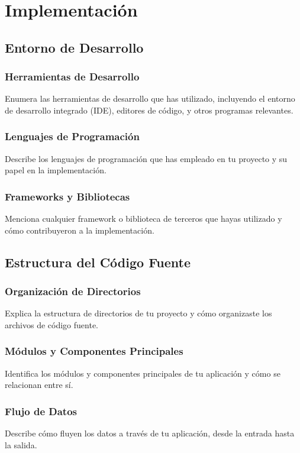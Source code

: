 \section{Implementación}

\subsection{Entorno de Desarrollo}

\subsubsection{Herramientas de Desarrollo}
Enumera las herramientas de desarrollo que has utilizado, incluyendo el entorno de desarrollo integrado (IDE), editores de código, y otros programas relevantes.

\subsubsection{Lenguajes de Programación}
Describe los lenguajes de programación que has empleado en tu proyecto y su papel en la implementación.

\subsubsection{Frameworks y Bibliotecas}
Menciona cualquier framework o biblioteca de terceros que hayas utilizado y cómo contribuyeron a la implementación.

\subsection{Estructura del Código Fuente}

\subsubsection{Organización de Directorios}
Explica la estructura de directorios de tu proyecto y cómo organizaste los archivos de código fuente.

\subsubsection{Módulos y Componentes Principales}
Identifica los módulos y componentes principales de tu aplicación y cómo se relacionan entre sí.

\subsubsection{Flujo de Datos}
Describe cómo fluyen los datos a través de tu aplicación, desde la entrada hasta la salida.

